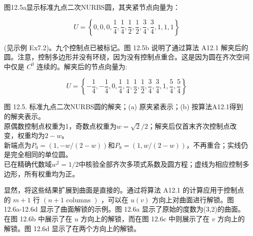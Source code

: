 \documentclass[../main.tex]{subfiles}
\begin{document}
图12.5a显示标准九点二次NURBS圆，其夹紧节点向量为：

\[
U = \left\{  {0,0,0,\frac{1}{4},\frac{1}{4},\frac{1}{2},\frac{1}{2},\frac{3}{4},\frac{3}{4},1,1,1}\right\}
\]

(见示例 Ex7.2)。九个控制点已被标记。图 12.5b 说明了通过算法 A12.1 解夹后的圆。注意，控制多边形并没有环绕，因为没有控制点重合。这是因为圆在齐次空间中仅是 \({C}^{0}\) 连续的。解夹后的节点向量为:

\[
U = \left\{  {-\frac{1}{4}, - \frac{1}{4},0,\frac{1}{4},\frac{1}{4},\frac{1}{2},\frac{1}{2},\frac{3}{4},\frac{3}{4},1,\frac{5}{4},\frac{5}{4}}\right\}
\]



\begin{center}
\begin{minipage}{37cm}
\centering
{}
\par\smallskip
图 12.5. 标准九点二次NURBS圆的解夹；(a) 原夹紧表示；(b) 按算法A12.1得到的解夹表示。\\
原偶数控制点权重为1，奇数点权重为$w=\sqrt2/2$；解夹后仅首末齐次控制点改变，权重均为$2-w$。\\
新端点为$P_0=(1,-w/(2-w))$和$P_8=(1,w/(2-w))$，不再重合；实线仍是完全相同的单位圆。\\
已在精确代数域$w^2=1/2$中核验全部齐次多项式系数及圆方程；虚线为相应控制多边形，所有权重均为正。
\end{minipage}
\end{center}

显然，将这些结果扩展到曲面是直接的。通过将算法 A12.1 的计算应用于控制点的 \(m + 1\) 行 \(\left( {n + 1\text{ columns }}\right)\) ，可以在 \(u\left( v\right)\) 方向上对曲面进行解锁。图 12.6a-12.6d 显示了曲面解锁的示例。图 12.6a 显示了原始的度数为(3,2)的曲面。在图 12.6b 中展示了在 \(u\) 方向上的解锁，而在图 12.6c 中则展示了在 \(v\) 方向上的解锁。图 12.6d 显示了在两个方向上的解锁。
\end{document}
